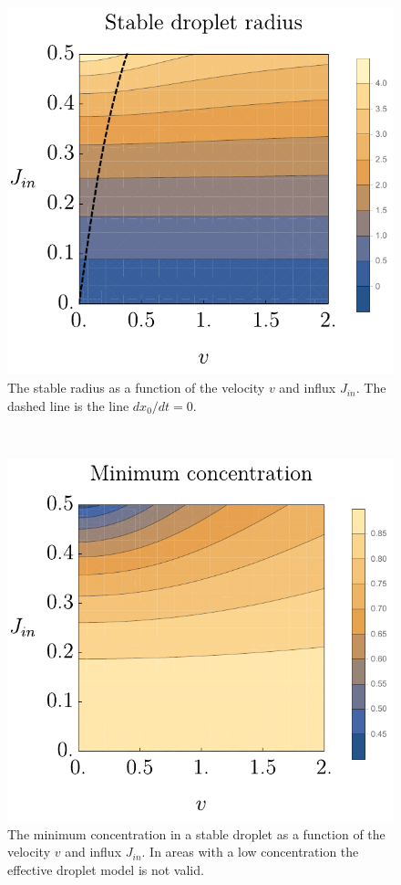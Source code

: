 \documentclass{Dissertate}
\let\origfigure\figure
\let\endorigfigure\endfigure
\renewenvironment{figure}[1][2] {
    \expandafter\origfigure\expandafter[H]
} {
    \endorigfigure
}
\begin{document}
\begin{figure}[t]
    \centering
    \begin{subfigure}[t]{0.5\textwidth}
        \centering
        \includegraphics{source/figures/pdf/Stable_nodecay.pdf}
        \caption{The stable radius as a function of the velocity \(v\) and
influx \(J_{in}\). The dashed line is the line
\(dx_0/dt=0\).\label{fig:stableradnodecay}}
    \end{subfigure}%
    ~ 
    \begin{subfigure}[t]{0.5\textwidth}
        \centering
        \includegraphics{source/figures/pdf/minimumconcentration.pdf}
        \caption{The minimum concentration in a stable droplet as a function of the velocity \(v\) and influx \(J_{in}\). In areas with a low
concentration the effective droplet model is not valid.
        \label{fig:minconnodecay}}
    \end{subfigure}
    \caption{}
\end{figure}
\end{document}
